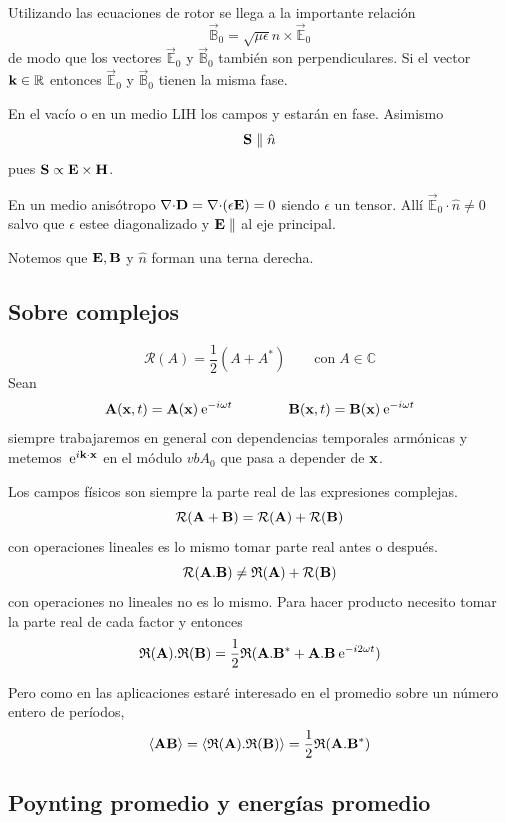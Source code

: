 \documentclass[10pt,oneside]{CBFT_book}
\begin{document}
Utilizando las ecuaciones de rotor se llega a la importante relación 
\[
	\vec{\mathbb{B}}_0 = \sqrt{\mu\epsilon} \hat{n} \times \vec{\mathbb{E}}_0
\]
de modo que los vectores $\vec{\mathbb{E}}_0$ y $\vec{\mathbb{B}}_0$ también son perpendiculares.
Si el vector $\vb{k} \in \mathbb{R}$ entonces $\vec{\mathbb{E}}_0$ y $\vec{\mathbb{B}}_0$
tienen la misma fase.

En el vacío o en un medio LIH los campos  y  estarán en fase.
Asimismo
\[
	\vb{S} \parallel \hat{n}
\]
pues $\vb{S} \propto \pv{E}{H} $.

En un medio anisótropo $\divem{D}=\divem{}(\epsilon \vb{E}) = 0$ siendo $\epsilon$ un tensor.
Allí $\vec{\mathbb{E}}_0 \cdot \hat{n} \neq 0$ salvo que $\epsilon$ estee diagonalizado y
$\vb{E} \parallel$ al eje principal.

Notemos que $\vb{E},\vb{B}$ y $\hat{n}$ forman una terna derecha.

\subsection{Sobre complejos}
\[
	\mathcal{R}(A) = \frac{1}{2}( A + A^* )	\qquad \text{con} \; A \in \mathbb{C}
\]
Sean 
\[
	\vb{A}(\vb{x},t) = \vb{A}(\vb{x})\euler^{-i\omega t} \qquad \qquad 
			\vb{B}(\vb{x},t) = \vb{B}(\vb{x})\euler^{-i\omega t}
\]
siempre trabajaremos en general con dependencias temporales armónicas y metemos $\euler^{i\pe{k}{x}}$ en el 
módulo $vb{A}_0$ que pasa a depender de $\vb{x}$.

Los campos físicos son siempre la parte real de las expresiones complejas.
\[
	\mathcal{R}(\vb{A} + \vb{B}) = \mathcal{R}( \vb{A} ) + \mathcal{R}( \vb{B} )
\]
con operaciones lineales es lo mismo tomar parte real antes o después.
\[
	\mathcal{R}(\vb{A}.\vb{B}) \neq  \mathfrak{R}( \vb{A} ) + \mathcal{R}( \vb{B} )
\]
con operaciones no lineales no es lo mismo.
Para hacer producto necesito tomar la parte real de cada factor y entonces
\[
	\mathfrak{R}( \vb{A} ).\mathfrak{R}( \vb{B} ) = \frac{1}{2}\mathfrak{R}( \vb{A}.\vb{B}^* + 
			\vb{A}.\vb{B} \euler^{ -i 2 \omega t })
\]

Pero como en las aplicaciones estaré interesado en el promedio sobre un número entero de períodos,
\[
	\langle \vb{A} \vb{B} \rangle = \langle \mathfrak{R}( \vb{A} ). \mathfrak{R}( \vb{B} ) \rangle =
			\frac{1}{2} \mathfrak{R} ( \vb{A}.\vb{B}^* )
\]

\subsection{Poynting promedio y energías promedio}
\end{document}

